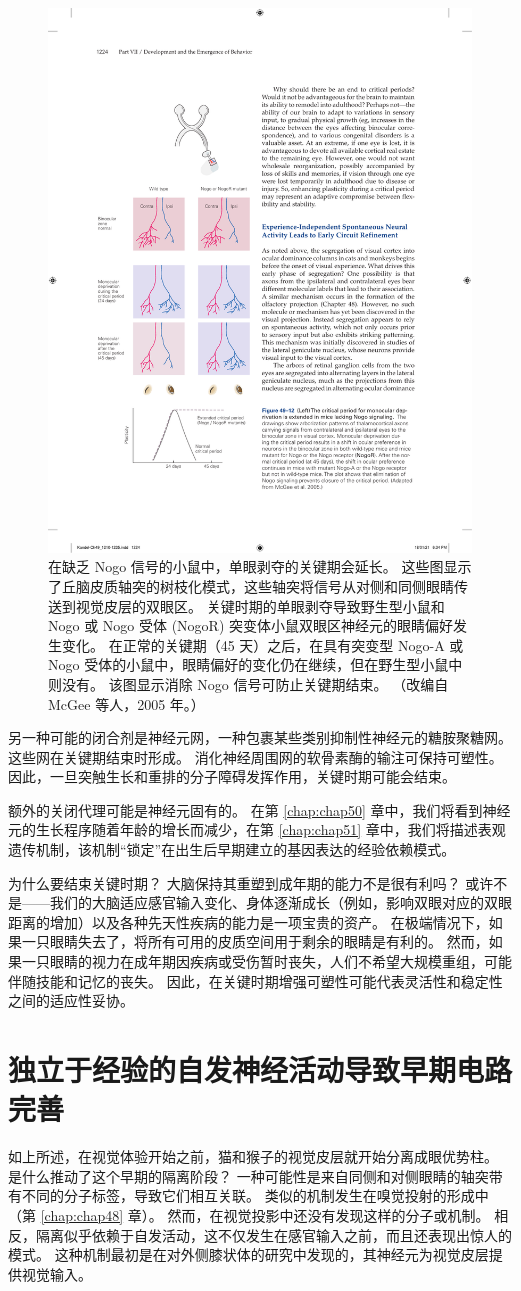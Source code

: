 \begin{figure}[htbp]
	\centering
	\includegraphics[width=0.5\linewidth]{chap49/fig_49_12}
	\caption{在缺乏 Nogo 信号的小鼠中，单眼剥夺的关键期会延长。 这些图显示了丘脑皮质轴突的树枝化模式，这些轴突将信号从对侧和同侧眼睛传送到视觉皮层的双眼区。 关键时期的单眼剥夺导致野生型小鼠和 Nogo 或 Nogo 受体 (NogoR) 突变体小鼠双眼区神经元的眼睛偏好发生变化。 在正常的关键期（45 天）之后，在具有突变型 Nogo-A 或 Nogo 受体的小鼠中，眼睛偏好的变化仍在继续，但在野生型小鼠中则没有。 该图显示消除 Nogo 信号可防止关键期结束。 （改编自 McGee 等人，2005 年。）}
	\label{fig:49_12}
\end{figure}

另一种可能的闭合剂是神经元网，一种包裹某些类别抑制性神经元的糖胺聚糖网。 这些网在关键期结束时形成。 消化神经周围网的软骨素酶的输注可保持可塑性。 因此，一旦突触生长和重排的分子障碍发挥作用，关键时期可能会结束。

额外的关闭代理可能是神经元固有的。 在第 \ref{chap:chap50} 章中，我们将看到神经元的生长程序随着年龄的增长而减少，在第 \ref{chap:chap51} 章中，我们将描述表观遗传机制，该机制“锁定”在出生后早期建立的基因表达的经验依赖模式。

为什么要结束关键时期？ 大脑保持其重塑到成年期的能力不是很有利吗？ 或许不是——我们的大脑适应感官输入变化、身体逐渐成长（例如，影响双眼对应的双眼距离的增加）以及各种先天性疾病的能力是一项宝贵的资产。 在极端情况下，如果一只眼睛失去了，将所有可用的皮质空间用于剩余的眼睛是有利的。 然而，如果一只眼睛的视力在成年期因疾病或受伤暂时丧失，人们不希望大规模重组，可能伴随技能和记忆的丧失。 因此，在关键时期增强可塑性可能代表灵活性和稳定性之间的适应性妥协。

\section{独立于经验的自发神经活动导致早期电路完善}
如上所述，在视觉体验开始之前，猫和猴子的视觉皮层就开始分离成眼优势柱。 是什么推动了这个早期的隔离阶段？ 一种可能性是来自同侧和对侧眼睛的轴突带有不同的分子标签，导致它们相互关联。 类似的机制发生在嗅觉投射的形成中（第 \ref{chap:chap48} 章）。 然而，在视觉投影中还没有发现这样的分子或机制。 相反，隔离似乎依赖于自发活动，这不仅发生在感官输入之前，而且还表现出惊人的模式。 这种机制最初是在对外侧膝状体的研究中发现的，其神经元为视觉皮层提供视觉输入。

